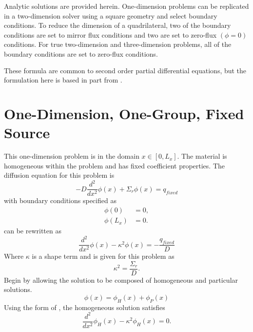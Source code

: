   Analytic solutions are provided herein. One-dimension problems can be 
  replicated in a two-dimension solver using a square geometry and select 
  boundary conditions. To reduce the dimension of a quadrilateral, two of the 
  boundary conditions are set to mirror flux conditions and two are set to 
  zero-flux $(\phi = 0)$ conditions. For true two-dimension and three-dimension 
  problems, all of the boundary conditions are set to zero-flux conditions.
  
  These formula are common to second order partial differential equations, but
  the formulation here is based in part from \cite{textbooklewis}.

\section{One-Dimension, One-Group, Fixed Source}
  \label{sec:deriv_1dfixedsrc}
  This one-dimension problem is in the domain $x \in [0,L_x]$. The material is
  homogeneous within the problem and has fixed coefficient properties.
  The diffusion equation for this problem is 
  \begin{equation}
    \label{eq:1dfixed}
    -D \frac{d^2}{dx^2} \phi(x) + \Sigma_r \phi(x) = q_{fixed}
  \end{equation}
  with boundary conditions specified as
  \begin{align}
    \label{eq:1dfixed_bc1}
    \phi(0) &= 0, \\
    \label{eq:1dfixed_bc2}
    \phi(L_x) &= 0.
  \end{align}
   can be rewritten as
  \begin{equation}
    \label{eq:1dfixed_buckle}
    \frac{d^2}{dx^2} \phi(x) - \kappa^2 \phi(x) = - \frac{q_{fixed}}{D}
  \end{equation}
  Where $\kappa$ is a shape term and is given for this problem as
  \begin{equation}
    \label{eq:1dfixed_b2}
    \kappa^2 = \frac{\Sigma_r}{D}.
  \end{equation}
  Begin by allowing the solution to be composed of homogeneous and particular
  solutions. 
  \begin{equation} 
    \phi(x) = \phi_H(x) + \phi_P(x)
  \end{equation}
  Using the form of , the homogeneous solution satisfies 
  \begin{equation}
    \label{eq:1dfixed_homog}
    \frac{d^2}{dx^2} \phi_H(x) - \kappa^2 \phi_H(x) = 0.
  \end{equation}
